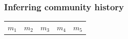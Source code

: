 \begin{frame}[t]
    \frametitle{Inferring community history}

    \vspace{-7mm}

    \begin{minipage}[t][0.1\textheight][c]{1.1\linewidth}
        \begin{adjustwidth}{-0.5em}{}
            \begin{tabular}{ p{2.1cm} p{2.1cm} p{2.1cm} p{2.1cm} p{2.1cm} }
                $m_1$ & $m_2$ & $m_3$ & $m_4$ & $m_5$ \\
            \end{tabular}
        \end{adjustwidth}
    \end{minipage}

    \vspace{-2mm}


\end{frame}
